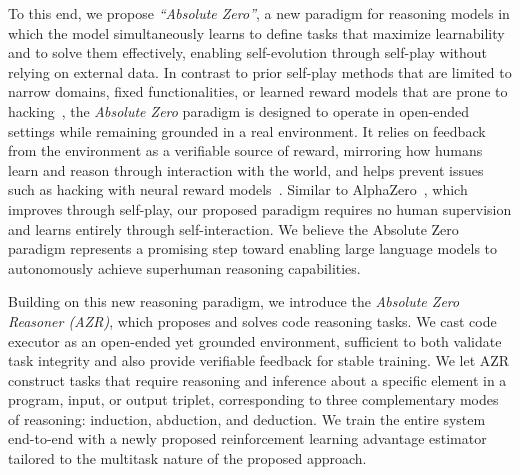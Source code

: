 \documentclass{article}
\begin{document}
To this end, we propose \emph{``Absolute Zero''}, a new paradigm for reasoning models in which the model simultaneously learns to define tasks that maximize learnability and to solve them effectively, enabling self-evolution through self-play without relying on external data. In contrast to prior self-play methods that are limited to narrow domains, fixed functionalities, or learned reward models that are prone to hacking~\citep{silver2017mastering, chen2025spcevolvingselfplaycritic, chen2024self}, the \emph{Absolute Zero} paradigm is designed to operate in open-ended settings while remaining grounded in a real environment. It relies on feedback from the environment as a verifiable source of reward, mirroring how humans learn and reason through interaction with the world, and helps prevent issues such as hacking with neural reward models~\citep{hughes2024open}. Similar to AlphaZero~\citep{silver2017mastering}, which improves through self-play, our proposed paradigm requires no human supervision and learns entirely through self-interaction. We believe the Absolute Zero paradigm represents a promising step toward enabling large language models to autonomously achieve superhuman reasoning capabilities.

Building on this new reasoning paradigm, we introduce the \emph{Absolute Zero Reasoner (AZR)}, which proposes and solves code reasoning tasks. We cast code executor as an open-ended yet grounded environment, sufficient to both validate task integrity and also provide verifiable feedback for stable training. We let AZR construct tasks that require reasoning and inference about a specific element in a program, input, or output triplet, corresponding to three complementary modes of reasoning: induction, abduction, and deduction. We train the entire system end-to-end with a newly proposed reinforcement learning advantage estimator tailored to the multitask nature of the proposed approach.
\end{document}

